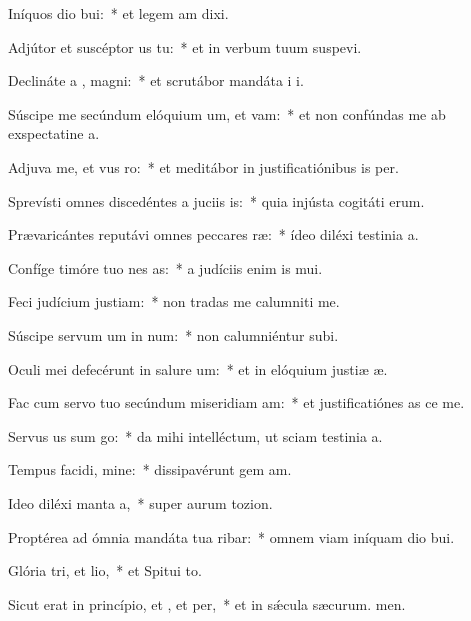\item Iníquos dio bui:~* et legem am dixi.
\item Adjútor et suscéptor us  tu:~* et in verbum tuum suspevi.
\item Declináte a , magni:~* et scrutábor mandáta i i.
\item Súscipe me secúndum elóquium um, et vam:~* et non confúndas me ab exspectatine a.
\item Adjuva me, et vus ro:~* et meditábor in justificatiónibus is per.
\item Sprevísti omnes discedéntes a juciis is:~* quia injústa cogitáti erum.
\item Prævaricántes reputávi omnes peccares ræ:~* ídeo diléxi testinia a.
\item Confíge timóre tuo nes as:~* a judíciis enim is mui.
\item Feci judícium  justiam:~* non tradas me calumniti me.
\item Súscipe servum um in num:~* non calumniéntur  subi.
\item Oculi mei defecérunt in salure um:~* et in elóquium justiæ æ.
\item Fac cum servo tuo secúndum miseridiam am:~* et justificatiónes as ce me.
\item Servus us sum go:~* da mihi intelléctum, ut sciam testinia a.
\item Tempus facidi, mine:~* dissipavérunt gem am.
\item Ideo diléxi manta a,~* super aurum  tozion.
\item Proptérea ad ómnia mandáta tua ribar:~* omnem viam iníquam dio bui.
\item Glória tri, et lio,~* et Spitui to.
\item Sicut erat in princípio, et , et per,~* et in sǽcula sæcurum. men.
